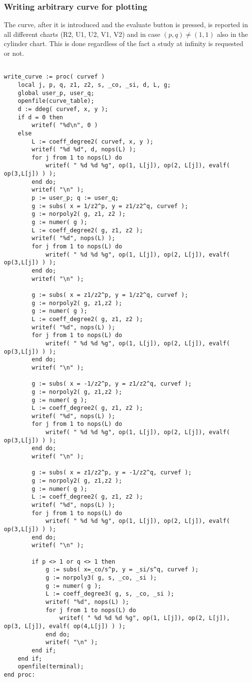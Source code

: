 \documentclass[a4paper,10pt]{article}
\begin{document}
\subsubsection{Writing arbitrary curve for plotting}

The curve, after it is introduced and the evaluate button is pressed, is reported in all different charts (R2, U1, U2, V1, V2) and in case $(p,q)\not=(1,1)$ also in the cylinder chart.  This is done regardless of the fact a study at infinity is requested or not.

\begin{lstlisting}[name=writelog]

write_curve := proc( curvef )
    local j, p, q, z1, z2, s, _co, _si, d, L, g;
    global user_p, user_q;
    openfile(curve_table);
    d := ddeg( curvef, x, y );
    if d = 0 then
        writef( "%d\n", 0 )
    else
        L := coeff_degree2( curvef, x, y );
        writef( "%d %d", d, nops(L) );
        for j from 1 to nops(L) do
            writef( " %d %d %g", op(1, L[j]), op(2, L[j]), evalf( op(3,L[j]) ) );
        end do;
        writef( "\n" );
        p := user_p; q := user_q;
        g := subs( x = 1/z2^p, y = z1/z2^q, curvef );
        g := norpoly2( g, z1, z2 );
        g := numer( g );
        L := coeff_degree2( g, z1, z2 );
        writef( "%d", nops(L) );
        for j from 1 to nops(L) do
            writef( " %d %d %g", op(1, L[j]), op(2, L[j]), evalf( op(3,L[j]) ) );
        end do;
        writef( "\n" );

        g := subs( x = z1/z2^p, y = 1/z2^q, curvef );
        g := norpoly2( g, z1,z2 );
        g := numer( g );
        L := coeff_degree2( g, z1, z2 );
        writef( "%d", nops(L) );
        for j from 1 to nops(L) do
            writef( " %d %d %g", op(1, L[j]), op(2, L[j]), evalf( op(3,L[j]) ) );
        end do;
        writef( "\n" );

        g := subs( x = -1/z2^p, y = z1/z2^q, curvef );
        g := norpoly2( g, z1,z2 );
        g := numer( g );
        L := coeff_degree2( g, z1, z2 );
        writef( "%d", nops(L) );
        for j from 1 to nops(L) do
            writef( " %d %d %g", op(1, L[j]), op(2, L[j]), evalf( op(3,L[j]) ) );
        end do;
        writef( "\n" );

        g := subs( x = z1/z2^p, y = -1/z2^q, curvef );
        g := norpoly2( g, z1,z2 );
        g := numer( g );
        L := coeff_degree2( g, z1, z2 );
        writef( "%d", nops(L) );
        for j from 1 to nops(L) do
            writef( " %d %d %g", op(1, L[j]), op(2, L[j]), evalf( op(3,L[j]) ) );
        end do;
        writef( "\n" );

        if p <> 1 or q <> 1 then
            g := subs( x=_co/s^p, y = _si/s^q, curvef );
            g := norpoly3( g, s, _co, _si );
            g := numer( g );
            L := coeff_degree3( g, s, _co, _si );
            writef( "%d", nops(L) );
            for j from 1 to nops(L) do
                writef( " %d %d %d %g", op(1, L[j]), op(2, L[j]), op(3, L[j]), evalf( op(4,L[j]) ) );
            end do;
            writef( "\n" );
        end if;
    end if;
    openfile(terminal);
end proc:
\end{lstlisting}
\end{document}
